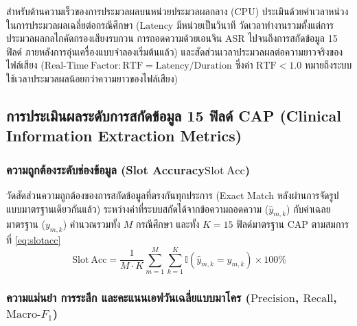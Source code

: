 สำหรับด้านความเร็วของการประมวลผลบนหน่วยประมวลผลกลาง (CPU) ประเมินด้วยค่าเวลาหน่วงในการประมวลผลเฉลี่ยต่อกรณีศึกษา ($\mathrm{Latency}$ มีหน่วยเป็นวินาที วัดเวลาทำงานรวมตั้งแต่การประมวลผลกลไกคัดกรองเสียงรบกวน การถอดความด้วยเอนจิน ASR ไปจนถึงการสกัดข้อมูล 15 ฟิลด์ ภายหลังการอุ่นเครื่องแบบจำลองเริ่มต้นแล้ว) และสัดส่วนเวลาประมวลผลต่อความยาวจริงของไฟล์เสียง ($\mathrm{Real\text{-}Time\ Factor: RTF} = \mathrm{Latency} / \mathrm{Duration}$ ซึ่งค่า $\mathrm{RTF} < 1.0$ หมายถึงระบบใช้เวลาประมวลผลน้อยกว่าความยาวของไฟล์เสียง)

\subsection{การประเมินผลระดับการสกัดข้อมูล 15 ฟิลด์ CAP (Clinical Information Extraction Metrics)}

\subsubsection{ความถูกต้องระดับช่องข้อมูล (Slot Accuracy$\mathrm{Slot\ Acc}$)}

วัดสัดส่วนความถูกต้องของการสกัดข้อมูลที่ตรงกันทุกประการ (Exact Match หลังผ่านการจัดรูปแบบมาตรฐานเดียวกันแล้ว) ระหว่างค่าที่ระบบสกัดได้จากข้อความถอดความ ($\hat{y}_{m,k}$) กับค่าเฉลยมาตรฐาน ($y_{m,k}$) คำนวณรวมทั้ง $M$ กรณีศึกษา และทั้ง $K = 15$ ฟิลด์มาตรฐาน CAP ตามสมการที่ \eqref{eq:slotacc}
\begin{equation}
\mathrm{Slot\ Acc} = \frac{1}{M \cdot K} \sum_{m=1}^{M} \sum_{k=1}^{K} \mathbb{I}\!\left(\hat{y}_{m,k} = y_{m,k}\right) \times 100\%
\label{eq:slotacc}
\end{equation}

\subsubsection{ความแม่นยำ การระลึก และคะแนนเอฟวันเฉลี่ยแบบมาโคร ($\mathrm{Precision}$, $\mathrm{Recall}$, $\mathrm{Macro\text{-}}F_1$)}

